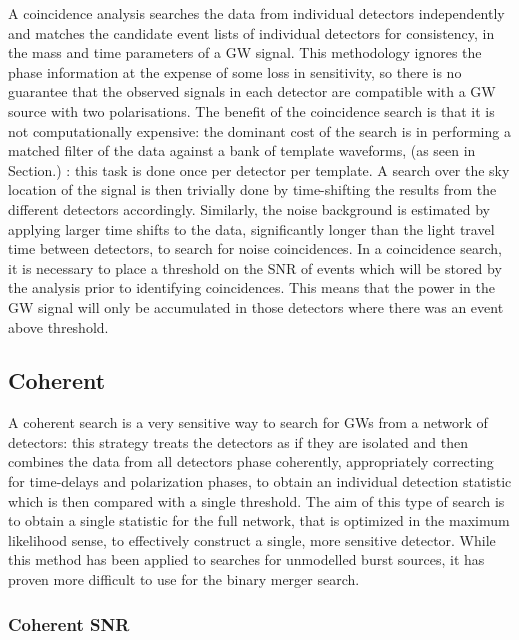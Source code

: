 \documentclass[binding=0.6cm, LaM]{sapthesis}
\begin{document}
	A coincidence analysis searches the data from individual detectors independently 	
	and matches the candidate event lists of individual detectors for consistency,
	in the mass and time parameters of a GW signal.
	This methodology ignores the phase information at the expense of some loss in sensitivity, 
	so there is no guarantee that the observed signals in each detector 
	are compatible with a GW source with two polarisations.
	The benefit of the coincidence search is that it is not computationally expensive: 
	the dominant cost of the search is in performing a matched filter 
	of the data against a bank of template waveforms, (as seen in Section.) :
        this task is done once per detector per template.
	A search over the sky location of the signal is then trivially done 
	by time-shifting the results from the different detectors accordingly.
        Similarly, the noise background is estimated by applying larger time shifts to the data,
        significantly longer than the light travel time between detectors, to search for noise coincidences.
        In a coincidence search, it is necessary to place a threshold on the SNR of events
        which will be stored by the analysis prior to identifying coincidences.
        This means that the power in the GW signal will only be accumulated
	in those detectors where there was an event above threshold.

\subsection{Coherent}

	A coherent search is a very sensitive way to search for GWs from a network of detectors:
	this strategy treats the detectors as if they are isolated 
	and then combines the data from all detectors phase coherently, 
	appropriately correcting for time-delays and polarization phases, 
	to obtain an individual detection statistic which is then compared with a single threshold. 
	The aim of this type of search is to obtain a single statistic for the full 
	network, that is optimized in the maximum likelihood sense, 
	to effectively construct a single, more sensitive detector.
 	While this method has been applied to searches for unmodelled burst sources,
        it has proven more difficult to use for the binary merger search.

\subsubsection{Coherent SNR}
	
\end{document}
